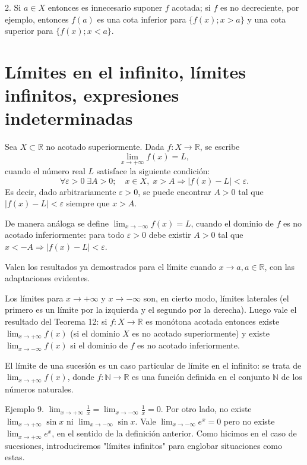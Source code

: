 \documentclass[12pt,oneside]{book}
\begin{document}
2. Si \(a \in X\) entonces es innecesario suponer \(f\) acotada; si \(f\) es no decreciente, por ejemplo, entonces \(f(a)\) es una cota inferior para \(\{f(x); x > a\}\) y una cota superior para \(\{f(x); x < a\}\).

\section{Límites en el infinito, límites infinitos, expresiones indeterminadas}

Sea \(X \subset \mathbb{R}\) no acotado superiormente. Dada \(f: X \to \mathbb{R}\), se escribe
\[
\lim_{x \to +\infty} f(x) = L,
\]
cuando el número real \(L\) satisface la siguiente condición:
\[
\forall \varepsilon > 0 \; \exists A > 0; \quad x \in X, \; x > A \Rightarrow |f(x) - L| < \varepsilon.
\]
Es decir, dado arbitrariamente \(\varepsilon > 0\), se puede encontrar \(A > 0\) tal que \(|f(x) - L| < \varepsilon\) siempre que \(x > A\).

De manera análoga se define \(\lim_{x \to -\infty} f(x) = L\), cuando el dominio de \(f\) es no acotado inferiormente: para todo \(\varepsilon > 0\) debe existir \(A > 0\) tal que \(x < -A \Rightarrow |f(x) - L| < \varepsilon\).

Valen los resultados ya demostrados para el límite cuando \(x \to a, a \in \mathbb{R}\), con las adaptaciones evidentes.

Los límites para \(x \to +\infty\) y \(x \to -\infty\) son, en cierto modo, límites laterales (el primero es un límite por la izquierda y el segundo por la derecha). Luego vale el resultado del Teorema 12: si \(f: X \to \mathbb{R}\) es monótona acotada entonces existe \(\lim_{x \to +\infty} f(x)\) (si el dominio \(X\) es no acotado superiormente) y existe \(\lim_{x \to -\infty} f(x)\) si el dominio de \(f\) es no acotado inferiormente.

El límite de una sucesión es un caso particular de límite en el infinito: se trata de \( \lim_{x \to +\infty} f(x) \), donde \( f: \mathbb{N} \to \mathbb{R} \) es una función definida en el conjunto \( \mathbb{N} \) de los números naturales.

Ejemplo 9. \( \lim_{x \to +\infty} \frac{1}{x} = \lim_{x \to -\infty} \frac{1}{x} = 0 \). Por otro lado, no existe \( \lim_{x \to +\infty} \sin x \) ni \( \lim_{x \to -\infty} \sin x \). Vale \( \lim_{x \to -\infty} e^x = 0 \) pero no existe \( \lim_{x \to +\infty} e^x \), en el sentido de la definición anterior. Como hicimos en el caso de sucesiones, introduciremos "límites infinitos" para englobar situaciones como estas.
\end{document}
